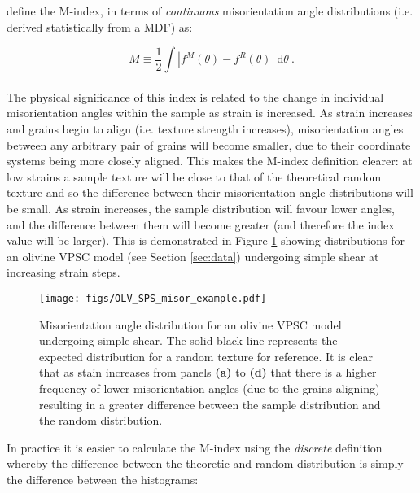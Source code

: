 \documentclass[a4paper,12pt,twoside]{report}
\numberwithin{equation}{chapter}
\begin{document}
\cite{Skemer} define the M-index, in terms of \emph{continuous} misorientation angle distributions (i.e. derived statistically from a MDF) as:

\begin{equation} \label{eq:Mindex_cont}
M \equiv \frac{1}{2} \int | f^M(\theta) - f^R(\theta) |\ \mathrm{d}\theta \ .
\end{equation}  
\\   
The physical significance of this index is related to the change in individual misorientation angles within the sample as strain is increased. As strain increases and grains begin to align (i.e. texture strength increases), misorientation angles between any arbitrary pair of grains will become smaller, due to their coordinate systems being more closely aligned. This makes the M-index definition clearer: at low strains a sample texture will be close to that of the theoretical random texture and so the difference between their misorientation angle distributions will be small. As strain increases, the sample distribution will favour lower angles, and the difference between them will become greater (and therefore the index value will be larger). This is demonstrated in Figure \ref{fig:misorientation_example} showing distributions for an olivine VPSC model (see Section \ref{sec:data}) undergoing simple shear at increasing strain steps.


\begin{figure}[t]
  \centering
    \texttt{[image: figs/OLV\_SPS\_misor\_example.pdf]}
  \caption[Misorientation angle distribution example (olivine VPSC)]{Misorientation angle distribution for an olivine VPSC model undergoing simple shear. The solid black line represents the expected distribution for a random texture for reference. It is clear that as stain increases from panels \textbf{(a)} to \textbf{(d)} that there is a higher frequency of lower misorientation angles (due to the grains aligning) resulting in a greater difference between the sample distribution and the random distribution.}
  \label{fig:misorientation_example}
\end{figure}

In practice it is easier to calculate the M-index using the \emph{discrete} definition whereby the difference between the theoretic and random distribution is simply the difference between the histograms:
\end{document}
